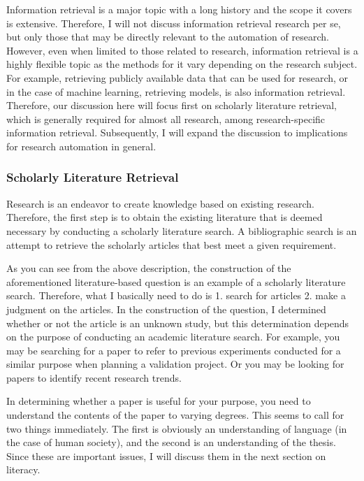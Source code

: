 \documentclass{article}
\begin{document}
Information retrieval is a major topic with a long history and the scope it covers is extensive. Therefore, I will not discuss information retrieval research per se, but only those that may be directly relevant to the automation of research. However, even when limited to those related to research, information retrieval is a highly flexible topic as the methods for it vary depending on the research subject. For example, retrieving publicly available data that can be used for research, or in the case of machine learning, retrieving models, is also information retrieval. Therefore, our discussion here will focus first on scholarly literature retrieval, which is generally required for almost all research, among research-specific information retrieval. Subsequently, I will expand the discussion to implications for research automation in general.

\subsubsection{Scholarly Literature Retrieval}
Research is an endeavor to create knowledge based on existing research. Therefore, the first step is to obtain the existing literature that is deemed necessary by conducting a scholarly literature search. A bibliographic search is an attempt to retrieve the scholarly articles that best meet a given requirement.

As you can see from the above description, the construction of the aforementioned literature-based question is an example of a scholarly literature search. Therefore, what I basically need to do is 1. search for articles 2. make a judgment on the articles. In the construction of the question, I determined whether or not the article is an unknown study, but this determination depends on the purpose of conducting an academic literature search. For example, you may be searching for a paper to refer to previous experiments conducted for a similar purpose when planning a validation project. Or you may be looking for papers to identify recent research trends.

In determining whether a paper is useful for your purpose, you need to understand the contents of the paper to varying degrees. This seems to call for two things immediately. The first is obviously an understanding of language (in the case of human society), and the second is an understanding of the thesis. Since these are important issues, I will discuss them in the next section on literacy.
\end{document}
